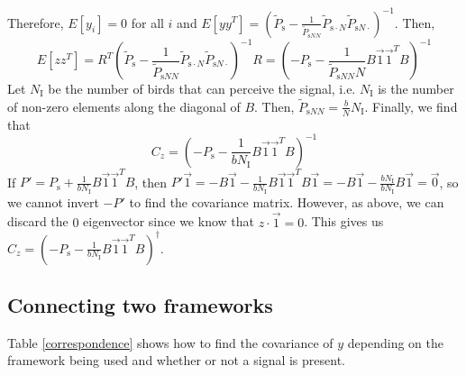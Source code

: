 \documentclass{article}
\begin{document}
Therefore, $E[y_i]=0$ for all $i$ and $E[yy^T]=(\tilde{P}_{\text{s}}-\frac{1}{\tilde{P}_{\text{s}NN}}\tilde{P}_{\text{s}\cdot N}\tilde{P}_{\text{s}N\cdot })^{-1}$. Then, 
\begin{equation*}
E[zz^T]=R^T\left(\tilde{P}_{\text{s}}-\frac{1}{\tilde{P}_{\text{s}NN}}\tilde{P}_{\text{s}\cdot N}\tilde{P}_{\text{s}N\cdot }\right)^{-1}R=\left(-P_\text{s}-\frac{1}{\tilde{P}_{\text{s}NN}N}B\vec{1}\vec{1}^TB\right)^{-1}
\end{equation*}
Let $N_\text{I}$ be the number of birds that can perceive the signal, i.e. $N_\text{I}$ is the number of non-zero elements along the diagonal of $B$. Then, $\tilde{P}_{\text{s}NN}=\frac{b}{N}N_\text{I}$. 
Finally, we find that 
\begin{equation}
C_z=\left(-P_\text{s}-\frac{1}{bN_\text{I}}B\vec{1}\vec{1}^TB\right)^{-1}
\end{equation}
If $P'=P_\text{s}+\frac{1}{bN_\text{I}}B\vec{1}\vec{1}^TB$, then $P'\vec{1}=-B\vec{1}-\frac{1}{bN_\text{I}}B\vec{1}\vec{1}^TB\vec{1}=-B\vec{1}-\frac{bN_\text{I}}{bN_\text{I}}B\vec{1}=\vec{0}$, so we cannot invert $-P'$ to find the covariance matrix. However, as above, we can discard the $0$ eigenvector since we know that $z\cdot \vec{1}=0$. This gives us $C_z=(-P_\text{s}-\frac{1}{bN_\text{I}}B\vec{1}\vec{1}^TB)^{\dagger}$.

\subsection{Connecting two frameworks }
Table \ref{correspondence} shows how to find the covariance of $y$ depending on the framework being used and whether or not a signal is present. 
\end{document}
